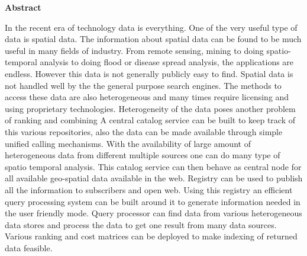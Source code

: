 \thispagestyle{empty}
\begin{center}
\textbf{\Large Abstract}
\end{center}
In the recent era of technology data is everything. One of the very useful type of data is spatial data. The information about spatial data can be found to be much useful in many fields of industry. From remote sensing, mining to doing spatio-temporal analysis to doing flood or disease spread analysis, the applications are endless. However this data is not generally publicly easy to find. Spatial data is not handled well by the the general purpose search engines. The methods to access these data are also heterogeneous and many times require licensing and using proprietary technologies. Heterogeneity of the data poses another problem of ranking and combining  A central catalog service can be built to keep track of this various repositories, also the data can be made available through simple unified calling mechanisms. With the availability of large amount of heterogeneous data from different multiple sources one can do many type of spatio temporal analysis. This catalog service can then behave as central node for all available geo-spatial data available in the web. Registry can be used to publish all the information to subscribers and open web. Using this registry an efficient query processing system can be built around it to generate information needed in the user friendly mode. Query processor can find data from various heterogeneous data stores and process the data to get one result from many data sources. Various ranking and cost matrices can be deployed to make indexing of returned data feasible.
\newpage
\thispagestyle{empty}
